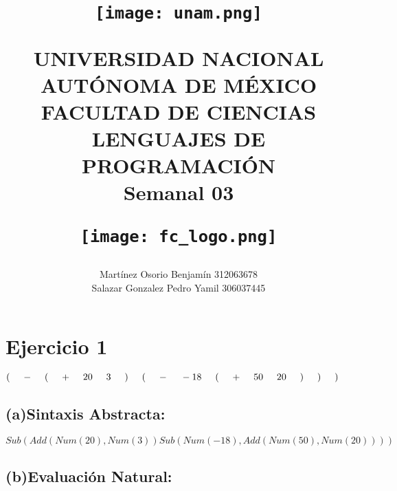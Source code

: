 \documentclass[12pt,letterpaper]{article}
\title{
		\vspace{-0.7in} 	
		\usefont{OT1}{bch}{b}{n}
		
		\begin{minipage}{3cm}
        \vspace{-0.5in} 	
    	\begin{center}
    		\texttt{[image: unam.png]}
    	\end{center}
    \end{minipage}\hfill
    \begin{minipage}{10.7cm}
    	\begin{center}

\normalfont \normalsize \textsc{UNIVERSIDAD NACIONAL AUTÓNOMA DE MÉXICO \\ FACULTAD DE CIENCIAS \\ LENGUAJES DE PROGRAMACIÓN } \\
		\huge Semanal 03

    	\end{center}
     
    \end{minipage}\hfill
    \begin{minipage}{3.2cm}
    \vspace{-0.5in} 
    	\begin{center}
    		\texttt{[image: fc\_logo.png]}
    	\end{center}
    \end{minipage}

\author{Martínez Osorio Benjamín 312063678 \\Salazar Gonzalez Pedro Yamil 306037445}
\date{}

}
\begin{document}
\maketitle

\section*{Ejercicio 1}
\textbf{\large $( \hspace{0.5cm}-\hspace{0.5cm} (\hspace{0.5cm} +\hspace{0.5cm} 20\hspace{0.5cm} 3\hspace{0.5cm})\hspace{0.5cm} (\hspace{0.5cm} -\hspace{0.5cm} -18\hspace{0.5cm} (\hspace{0.5cm} +\hspace{0.5cm} 50\hspace{0.5cm} 20\hspace{0.5cm})\hspace{0.5cm} ) \hspace{0.5cm}) $}\newline

\subsection*{(a)Sintaxis Abstracta:}

$Sub(Add(Num(20), Num(3)) Sub(Num(-18), Add(Num(50), Num(20))))$
\subsection*{(b)Evaluación Natural:}

    \begin{prooftree}
         
                 
    \end{prooftree}
\end{document}
